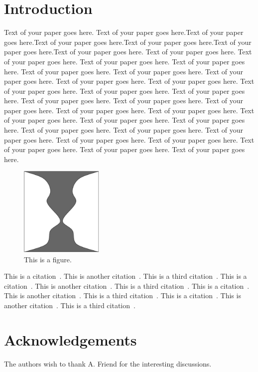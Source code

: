 \documentclass{jgaa-art}
\begin{document}
\Body %



\section{Introduction}\label{se:intro}

Text of your paper goes here. Text of your paper goes here.Text of your paper goes here.Text of your paper goes here.Text of your paper goes
here.Text of your paper goes here.Text of your paper goes here. Text of your paper goes here. Text of your paper goes here. Text of your paper goes
here. Text of your paper goes here. Text of your paper goes here. Text of your paper goes here. Text of your paper goes here. Text of your paper goes
here. Text of your paper goes here. Text of your paper goes here. Text of your paper goes here. Text of your paper goes here. Text of your paper goes
here. Text of your paper goes here. Text of your paper goes here. Text of your paper goes here. Text of your paper goes here. Text of your paper goes
here. Text of your paper goes here. Text of your paper goes here. Text of your paper goes here. Text of your paper goes here. Text of your paper goes
here. Text of your paper goes here. Text of your paper goes here. Text of your paper goes here. Text of your paper goes here. Text of your paper goes
here.

\begin{figure}[htbp]
\begin{center}
\includegraphics[width=4cm]{figures/figure1}
\end{center}
\caption{This is a figure.}
\end{figure}

This is a citation~\cite{g-fpc-01}. This is another citation~\cite{g-spc-03}. This is a third citation~\cite{g-tpc-99}. This is a
citation~\cite{g-fpc-01}. This is another citation~\cite{g-spc-03}. This is a third citation~\cite{g-tpc-99}. This is a citation~\cite{g-fpc-01}.
This is another citation~\cite{g-spc-03}. This is a third citation~\cite{g-tpc-99}. This is a citation~\cite{g-fpc-01}. This is another
citation~\cite{g-spc-03}. This is a third citation~\cite{g-tpc-99}.



\section*{Acknowledgements}

The authors wish to thank A. Friend for the interesting discussions.


\clearpage



\end{document}
